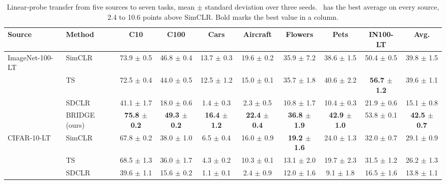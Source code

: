 \begin{table}[t]
\centering
\tiny
\setlength{\tabcolsep}{2.6pt}
\renewcommand{\arraystretch}{0.9}
\caption{Linear-probe transfer from five sources to seven tasks, mean $\pm$ standard deviation over three seeds. \method\ has the best average on every source, 2.4 to 10.6 points above SimCLR. Bold marks the best value in a column.}
\label{tab:main_transfer_linear}
\begin{adjustbox}{max width=\textwidth}
\begin{tabular}{l l c c c c c c c c}
\toprule
Source & Method & C10 & C100 & Cars & Aircraft & Flowers & Pets & IN100-LT & Avg. \\
\midrule
ImageNet-100-LT & SimCLR & 73.9 {\scriptsize$\pm$ 0.5} & 46.8 {\scriptsize$\pm$ 0.4} & 13.7 {\scriptsize$\pm$ 0.3} & 19.6 {\scriptsize$\pm$ 0.2} & 35.9 {\scriptsize$\pm$ 7.2} & 38.6 {\scriptsize$\pm$ 1.5} & 50.4 {\scriptsize$\pm$ 0.5} & 39.8 {\scriptsize$\pm$ 1.5} \\
 & TS & 72.5 {\scriptsize$\pm$ 0.4} & 44.0 {\scriptsize$\pm$ 0.5} & 12.5 {\scriptsize$\pm$ 1.2} & 15.0 {\scriptsize$\pm$ 0.1} & 35.7 {\scriptsize$\pm$ 1.8} & 40.6 {\scriptsize$\pm$ 2.2} & \textbf{56.7 {\scriptsize$\pm$ 1.2}} & 39.6 {\scriptsize$\pm$ 1.1} \\
 & SDCLR & 41.1 {\scriptsize$\pm$ 1.7} & 18.0 {\scriptsize$\pm$ 0.6} & 1.4 {\scriptsize$\pm$ 0.3} & 2.3 {\scriptsize$\pm$ 0.5} & 10.8 {\scriptsize$\pm$ 1.7} & 10.4 {\scriptsize$\pm$ 0.3} & 21.9 {\scriptsize$\pm$ 0.6} & 15.1 {\scriptsize$\pm$ 0.8} \\
\rowcolor{blue!10} & BRIDGE (ours) & \textbf{75.8 {\scriptsize$\pm$ 0.2}} & \textbf{49.3 {\scriptsize$\pm$ 0.2}} & \textbf{16.4 {\scriptsize$\pm$ 1.2}} & \textbf{22.4 {\scriptsize$\pm$ 0.4}} & \textbf{36.8 {\scriptsize$\pm$ 1.9}} & \textbf{42.9 {\scriptsize$\pm$ 1.0}} & 53.8 {\scriptsize$\pm$ 0.1} & \textbf{42.5 {\scriptsize$\pm$ 0.7}} \\
\midrule
CIFAR-10-LT & SimCLR & 67.8 {\scriptsize$\pm$ 0.2} & 38.0 {\scriptsize$\pm$ 1.0} & 6.5 {\scriptsize$\pm$ 0.4} & 16.0 {\scriptsize$\pm$ 0.9} & \textbf{19.2 {\scriptsize$\pm$ 1.6}} & 24.0 {\scriptsize$\pm$ 1.3} & 32.0 {\scriptsize$\pm$ 0.7} & 29.1 {\scriptsize$\pm$ 0.9} \\
 & TS & 68.5 {\scriptsize$\pm$ 1.3} & 36.0 {\scriptsize$\pm$ 1.7} & 4.3 {\scriptsize$\pm$ 0.2} & 10.3 {\scriptsize$\pm$ 0.1} & 13.1 {\scriptsize$\pm$ 2.0} & 19.7 {\scriptsize$\pm$ 2.3} & 31.5 {\scriptsize$\pm$ 1.2} & 26.2 {\scriptsize$\pm$ 1.3} \\
 & SDCLR & 39.6 {\scriptsize$\pm$ 1.1} & 15.6 {\scriptsize$\pm$ 0.2} & 1.1 {\scriptsize$\pm$ 0.1} & 2.4 {\scriptsize$\pm$ 0.9} & 12.0 {\scriptsize$\pm$ 1.6} & 9.1 {\scriptsize$\pm$ 1.8} & 16.5 {\scriptsize$\pm$ 1.6} & 13.8 {\scriptsize$\pm$ 1.1} \\

\end{tabular}
\end{adjustbox}
\end{table}
